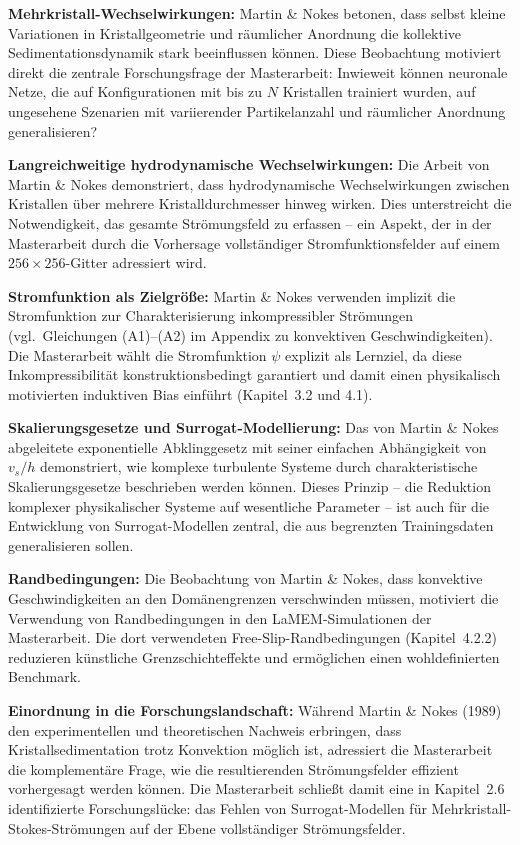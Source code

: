 \documentclass[a4paper,12pt]{article}
\begin{document}
\textbf{Mehrkristall-Wechselwirkungen:} Martin \& Nokes betonen, dass selbst kleine Variationen in Kristallgeometrie und räumlicher Anordnung die kollektive Sedimentationsdynamik stark beeinflussen können. Diese Beobachtung motiviert direkt die zentrale Forschungsfrage der Masterarbeit: Inwieweit können neuronale Netze, die auf Konfigurationen mit bis zu $N$ Kristallen trainiert wurden, auf ungesehene Szenarien mit variierender Partikelanzahl und räumlicher Anordnung generalisieren?

\textbf{Langreichweitige hydrodynamische Wechselwirkungen:} Die Arbeit von Martin \& Nokes demonstriert, dass hydrodynamische Wechselwirkungen zwischen Kristallen über mehrere Kristalldurchmesser hinweg wirken. Dies unterstreicht die Notwendigkeit, das gesamte Strömungsfeld zu erfassen -- ein Aspekt, der in der Masterarbeit durch die Vorhersage vollständiger Stromfunktionsfelder auf einem $256 \times 256$-Gitter adressiert wird.

\textbf{Stromfunktion als Zielgröße:} Martin \& Nokes verwenden implizit die Stromfunktion zur Charakterisierung inkompressibler Strömungen (vgl.\ Gleichungen (A1)--(A2) im Appendix zu konvektiven Geschwindigkeiten). Die Masterarbeit wählt die Stromfunktion $\psi$ explizit als Lernziel, da diese Inkompressibilität konstruktionsbedingt garantiert und damit einen physikalisch motivierten induktiven Bias einführt (Kapitel~3.2 und 4.1).

\textbf{Skalierungsgesetze und Surrogat-Modellierung:} Das von Martin \& Nokes abgeleitete exponentielle Abklinggesetz mit seiner einfachen Abhängigkeit von $v_s/h$ demonstriert, wie komplexe turbulente Systeme durch charakteristische Skalierungsgesetze beschrieben werden können. Dieses Prinzip -- die Reduktion komplexer physikalischer Systeme auf wesentliche Parameter -- ist auch für die Entwicklung von Surrogat-Modellen zentral, die aus begrenzten Trainingsdaten generalisieren sollen.

\textbf{Randbedingungen:} Die Beobachtung von Martin \& Nokes, dass konvektive Geschwindigkeiten an den Domänengrenzen verschwinden müssen, motiviert die Verwendung von Randbedingungen in den LaMEM-Simulationen der Masterarbeit. Die dort verwendeten Free-Slip-Randbedingungen (Kapitel~4.2.2) reduzieren künstliche Grenzschichteffekte und ermöglichen einen wohldefinierten Benchmark.

\textbf{Einordnung in die Forschungslandschaft:} Während Martin \& Nokes (1989) den experimentellen und theoretischen Nachweis erbringen, dass Kristallsedimentation trotz Konvektion möglich ist, adressiert die Masterarbeit die komplementäre Frage, wie die resultierenden Strömungsfelder effizient vorhergesagt werden können. Die Masterarbeit schließt damit eine in Kapitel~2.6 identifizierte Forschungslücke: das Fehlen von Surrogat-Modellen für Mehrkristall-Stokes-Strömungen auf der Ebene vollständiger Strömungsfelder.
\end{document}
